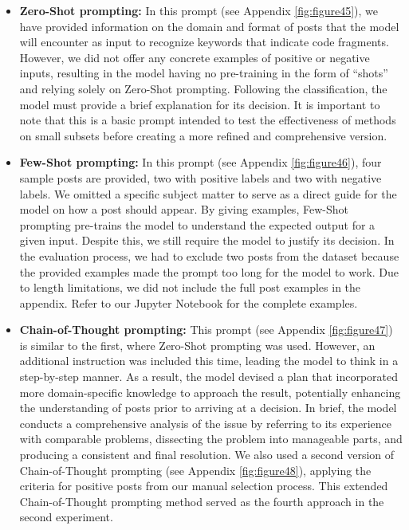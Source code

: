 \documentclass[english,bachelor]{swsLeipzig}
\begin{document}
\begin{itemize}
  \item \textbf{Zero-Shot prompting:} In this prompt (see Appendix \ref{fig:figure45}), we have provided information on the domain and format of posts that the model will encounter as input to recognize keywords that indicate code fragments. However, we did not offer any concrete examples of positive or negative inputs, resulting in the model having no pre-training in the form of ``shots'' and relying solely on Zero-Shot prompting. Following the classification, the model must provide a brief explanation for its decision. It is important to note that this is a basic prompt intended to test the effectiveness of methods on small subsets before creating a more refined and comprehensive version.
  \item \textbf{Few-Shot prompting:} In this prompt (see Appendix \ref{fig:figure46}), four sample posts are provided, two with positive labels and two with negative labels. We omitted a specific subject matter to serve as a direct guide for the model on how a post should appear. By giving examples, Few-Shot prompting pre-trains the model to understand the expected output for a given input. Despite this, we still require the model to justify its decision. In the evaluation process, we had to exclude two posts from the dataset because the provided examples made the prompt too long for the model to work. Due to length limitations, we did not include the full post examples in the appendix. Refer to our Jupyter Notebook for the complete examples.
  \item \textbf{Chain-of-Thought prompting:} This prompt (see Appendix \ref{fig:figure47}) is similar to the first, where Zero-Shot prompting was used.  However, an additional instruction was included this time, leading the model to think in a step-by-step manner. As a result, the model devised a plan that incorporated more domain-specific knowledge to approach the result, potentially enhancing the understanding of posts prior to arriving at a decision. In brief, the model conducts a comprehensive analysis of the issue by referring to its experience with comparable problems, dissecting the problem into manageable parts, and producing a consistent and final resolution. We also used a second version of Chain-of-Thought prompting (see Appendix \ref{fig:figure48}), applying the criteria for positive posts from our manual selection process. This extended Chain-of-Thought prompting method served as the fourth approach in the second experiment.
\end{itemize}
\end{document}

